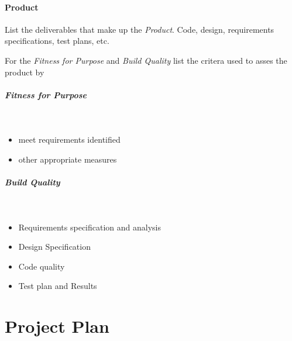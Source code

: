\paragraph{Product}  List the deliverables that make up the \emph{Product}.  Code, design, requirements specifications, test plans, etc.

For the \emph{Fitness for Purpose} and \emph{Build Quality}  list the critera used to asses the product by

\subparagraph{Fitness for Purpose}~
\begin{itemize}
	\item meet requirements identified
	\item other appropriate measures
\end{itemize}

\subparagraph{Build Quality}~
\begin{itemize}
	\item Requirements specification and analysis
	\item Design Specification
	\item Code quality
	\item Test plan and Results
\end{itemize}

\clearpage

\section{Project Plan}
\noindent
{}
